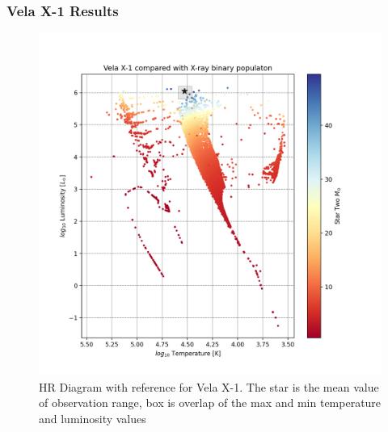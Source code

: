 \documentclass[12pt, a4paper]{article}
\begin{document}
    \subsubsection{Vela X-1 Results}
    \begin{figure}[H] 
        \centering
        \includegraphics[scale = .6]{figs/GeneratedFigs/VelaX-1/VelaX1XrBPopulationHRComp.png}
        \caption{HR Diagram with reference for Vela X-1. The star is the mean value of observation range, box is overlap of the max and min temperature and luminosity values}
        \label{VelaX1XrBPopulationHRComp}
    \end{figure}
\end{document}
